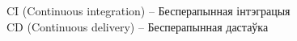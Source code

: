\thispagestyle{empty}
\noindent%
CI (Continuous integration) -- Бесперапынная інтэграцыя \\
CD (Continuous delivery) -- Бесперапынная дастаўка
\clearpage

